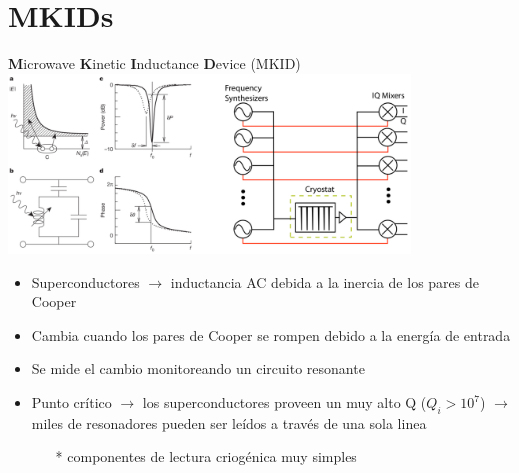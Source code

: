 \documentclass[ignorenonframetext,12pt]{beamer}
\begin{document}
\section{MKIDs}
\begin{frame}{\textbf{M}icrowave \textbf{K}inetic \textbf{I}nductance
				\textbf{D}evice (MKID)}
				\centering
												\includegraphics[width=0.8\textwidth]{concepto_mkid1}
				\begin{itemize}
								\item \footnotesize{Superconductores $\to$ inductancia AC debida a la
												inercia de los pares de Cooper}
								\item Cambia cuando los pares de Cooper se rompen debido a la
												energía de entrada
								\item Se mide el cambio monitoreando un circuito resonante
								\item Punto crítico $\to$ los superconductores proveen un muy
												alto Q ($Q_i > 10^7$) $\to$ miles de resonadores
												pueden ser leídos a través de una sola linea 
												\begin{itemize}
																\item[*] \scriptsize{{\color{blue}componentes de lectura criogénica muy
																				simples}}
												\end{itemize}
				\end{itemize}

\end{frame}
\end{document}
